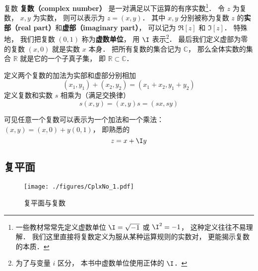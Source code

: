 

\begin{definition}{复数}
\textbf{复数（complex number）} 是一对满足以下运算的有序实数\footnote{一些教材常常先定义虚数单位 $\I = \sqrt{-1}$ 或 $\I^2 = -1$， 这种定义往往不易理解． 我们这里直接将复数定义为服从某种运算规则的实数对， 更能揭示复数的本质\cite{Rudin}．}． 令 $z$ 为复数， $x, y$ 为实数， 则可以表示为 $z = (x, y)$． 其中 $x,y$ 分别被称为复数 $z$ 的\textbf{实部（real part）}和\textbf{虚部（imaginary part）}， 可以记为 $\Re[z]$ 和 $\Im[z]$． 特殊地， 我们把复数 $(0, 1)$ 称为\textbf{虚数单位}， 用 $\I$ 表示\footnote{为了与变量 $i$ 区分， 本书中虚数单位使用正体的 $\I$．}． 最后我们定义虚部为零的复数 $(x, 0)$ 就是实数 $x$ 本身． 把所有复数的集合记为 $\mathbb C$， 那么全体实数的集合 $\mathbb R$ 就是它的一个子真子集， 即 $\mathbb R \subset \mathbb C$．

定义两个复数的加法为实部和虚部分别相加
\begin{equation}\label{CplxNo_eq1}
(x_1, y_1) + (x_2, y_2) = (x_1+ x_2, y_1 + y_2)
\end{equation}
定义复数和实数 $s$ 相乘为（满足交换律）
\begin{equation}\label{CplxNo_eq4}
s(x, y) = (x, y)s = (sx, sy)
\end{equation}
\end{definition}
可见任意一个复数可以表示为一个加法和一个乘法： $(x, y) = (x, 0) + y(0, 1)$， 即熟悉的
\begin{equation}
z = x + \I y
\end{equation}

\subsection{复平面}
\begin{figure}[ht]
\centering
\texttt{[image: ./figures/CplxNo\_1.pdf]}
\caption{复平面与复数} \label{CplxNo_fig1}
\end{figure}

